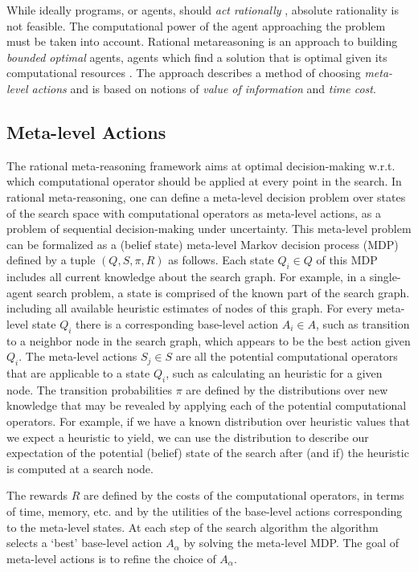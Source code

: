 While ideally programs, or agents, should {\em act rationally}
\cite{Russell.aima}, absolute rationality is not feasible. The
computational power of the agent approaching the problem must be taken
into account. Rational metareasoning \cite{Russell.right} is an
approach to building {\em bounded optimal} agents, agents which find a
solution that is optimal given its computational resources
\cite{Horvitz.reasoningabout}. The approach describes a method of
choosing {\em meta-level actions} and is based on notions of {\em
value of information} and {\em time cost}.

\subsection{Meta-level Actions}

The rational meta-reasoning framework aims at optimal
decision-making w.r.t. which computational operator should be applied
at every point in the search. In rational meta-reasoning, one can
define a meta-level decision problem over states of the search space
with computational operators as meta-level actions, as a problem of
sequential decision-making under uncertainty. This meta-level problem
can be formalized as a (belief state) meta-level Markov decision
process (MDP) defined by a tuple $(Q, S, \pi, R)$ as follows. Each
state $Q_i \in Q$ of this MDP includes all current knowledge about the
search graph. For example, in a single-agent search problem, a state
is comprised of the known part of the search graph. including all
available heuristic estimates of nodes of this graph. For every
meta-level state $Q_i$ there is a corresponding base-level action
$A_i \in A$, such as transition to a neighbor node in the search graph, which
appears to be the best action given $Q_i$. The
meta-level actions $S_j \in S$ are all the potential computational
operators that are applicable to a state $Q_i$, such as calculating an
heuristic for a given node. The transition probabilities $\pi$ are
defined by the distributions over new knowledge that may be revealed
by applying each of the potential computational operators.  For
example, if we have a known distribution over heuristic values that we
expect a heuristic to yield, we can use the distribution to describe
our expectation of the potential (belief) state of the search after
(and if) the heuristic is computed at a search node.

The rewards $R$ are defined by the costs of the computational
operators, in terms of time, memory, etc. and by the utilities of the
base-level actions corresponding to the meta-level states.
At each step of the search algorithm the algorithm selects a
`best' base-level action $A_\alpha$ by solving the meta-level MDP.
The goal of meta-level actions is to refine the choice of $A_\alpha$.

